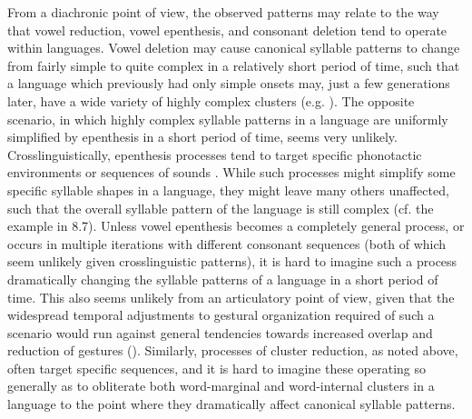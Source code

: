   From a diachronic point of view, the observed patterns may relate to the way that vowel reduction, vowel epenthesis, and consonant deletion tend to operate within languages. Vowel deletion may cause canonical syllable patterns to change from fairly simple to quite complex in a relatively short period of time, such that a language which previously had only simple onsets may, just a few generations later, have a wide variety of highly complex clusters (e.g. ). The opposite scenario, in which highly complex syllable patterns in a language are uniformly simplified by epenthesis in a short period of time, seems very unlikely. Crosslinguistically, epenthesis processes tend to target specific phonotactic environments or sequences of sounds \citep{Hall2011}. While such processes might simplify some specific syllable shapes in a language, they might leave many others unaffected, such that the overall syllable pattern of the language is still complex (cf. the  example in 8.7). Unless vowel epenthesis becomes a completely general process, or occurs in multiple iterations with different consonant sequences (both of which seem unlikely given crosslinguistic patterns), it is hard to imagine such a process dramatically changing the syllable patterns of a language in a short period of time. This also seems unlikely from an articulatory point of view, given that the widespread temporal adjustments to gestural organization required of such a scenario would run against general tendencies towards increased overlap and reduction of gestures (\citealt{BrowmanGoldstein1992b}). Similarly, processes of cluster reduction, as noted above, often target specific sequences, and it is hard to imagine these operating so generally as to obliterate both word-marginal and word-internal clusters in a language to the point where they dramatically affect canonical syllable patterns. 

